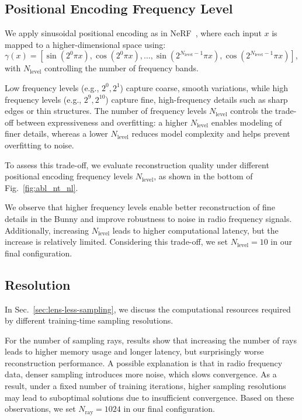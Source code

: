 \subsection{Positional Encoding Frequency Level}
We apply sinusoidal positional encoding as in NeRF~\cite{mildenhall2021nerf}, where each input \( x \) is mapped to a higher-dimensional space using:
\[
\gamma(x) = \left[ \sin(2^0 \pi x), \cos(2^0 \pi x), \ldots, \sin(2^{N_{\text{level}}-1} \pi x), \cos(2^{N_{\text{level}}-1} \pi x) \right],
\]
with \( N_{\text{level}} \) controlling the number of frequency bands.



Low frequency levels (e.g., \( 2^0, 2^1 \)) capture coarse, smooth variations,
while high frequency levels (e.g., \( 2^9, 2^{10} \)) capture fine, high-frequency details such as sharp edges or thin structures.
The number of frequency levels \( N_{\text{level}} \) controls the trade-off between expressiveness and overfitting:
a higher \( N_{\text{level}} \) enables modeling of finer details,
whereas a lower \( N_{\text{level}} \) reduces model complexity and helps prevent overfitting to noise.

To assess this trade-off, we evaluate reconstruction quality under different positional encoding frequency levels \( N_{\text{level}} \), as shown in the bottom of Fig.~\ref{fig:abl_nt_nl}.

We observe that higher frequency levels enable better reconstruction of fine details in the Bunny and improve robustness to noise in radio frequency signals.
Additionally, increasing \( N_{\text{level}} \) leads to higher computational latency, but the increase is relatively limited.
Considering this trade-off, we set \( N_{\text{level}} = 10 \) in our final configuration.

\subsection{Resolution}
In Sec.~\ref{sec:lens-less-sampling}, we discuss the computational resources required by different training-time sampling resolutions.

For the number of sampling rays, results show that increasing the number of rays leads to higher memory usage and longer latency, but surprisingly worse reconstruction performance.
A possible explanation is that in radio frequency data, denser sampling introduces more noise, which slows convergence.
As a result, under a fixed number of training iterations, higher sampling resolutions may lead to suboptimal solutions due to insufficient convergence.
Based on these observations, we set \( N_{\text{ray}} = 1024 \) in our final configuration.

